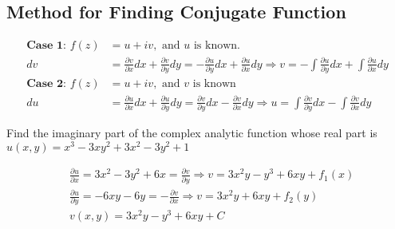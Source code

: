 	\subsection{Method for Finding Conjugate Function }
		\begin{align*}
		\textbf{Case 1: }f(z)&=u+i v,\text{ and $u$ is known.}\\
		d v&=\frac{\partial v}{\partial x} d x+\frac{\partial v}{\partial y} d y=-\frac{\partial u}{\partial y} d x+\frac{\partial u}{\partial x} d y \Rightarrow v=-\int \frac{\partial u}{\partial y} d x+\int \frac{\partial u}{\partial x} d y\\
		\textbf{Case 2: }f(z)&=u+i v,\text{ and $v$ is known}\\
		d u&=\frac{\partial u}{\partial x} d x+\frac{\partial u}{\partial y} d y=\frac{\partial v}{\partial y} d x-\frac{\partial v}{\partial x} d y \Rightarrow u=\int \frac{\partial v}{\partial y} d x-\int \frac{\partial v}{\partial x} d y
		\end{align*}
	\begin{exercise}
		 Find the imaginary part of the complex analytic function whose real part is $u(x, y)=x^{3}-3 x y^{2}+3 x^{2}-3 y^{2}+1$
	\end{exercise}
	\begin{answer}
		\begin{align*}
		&\frac{\partial u}{\partial x}=3 x^{2}-3 y^{2}+6 x=\frac{\partial v}{\partial y} \Rightarrow v=3 x^{2} y-y^{3}+6 x y+f_{1}(x) \\
		&\frac{\partial u}{\partial y}=-6 x y-6 y=-\frac{\partial v}{\partial x} \Rightarrow v=3 x^{2} y+6 x y+f_{2}(y) \\
		&v(x, y)=3 x^{2} y-y^{3}+6 x y+C
		\end{align*}
	\end{answer}
